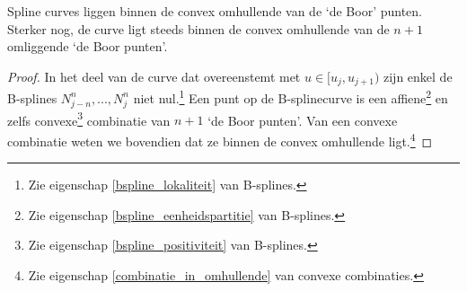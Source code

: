 \documentclass[computergesteund_ontwerp_van_curven_en_oppervlakken.tex]{subfiles}
\begin{document}
\begin{ei}
\label{splinecurve_in_complex_omhullende}
Spline curves liggen binnen de convex omhullende van de `de Boor' punten. Sterker nog, de curve ligt steeds binnen de convex omhullende van de $n+1$ omliggende `de Boor punten'.

\begin{proof}
In het deel van de curve dat overeenstemt met $u \in [u_j,u_{j+1})$ zijn enkel de B-splines $N_{j-n}^{n},..., N_{j}^{n}$ niet nul.\footnote{Zie eigenschap \ref{bspline_lokaliteit} van B-splines.} Een punt op de B-splinecurve is een affiene\footnote{Zie eigenschap \ref{bspline_eenheidspartitie} van B-splines.} en zelfs convexe\footnote{Zie eigenschap \ref{bspline_positiviteit} van B-splines.} combinatie van $n+1$ `de Boor punten'. Van een convexe combinatie weten we bovendien dat ze binnen de convex omhullende ligt.\footnote{Zie eigenschap \ref{combinatie_in_omhullende} van convexe combinaties.}
\end{proof}
\end{ei}
\end{document}

